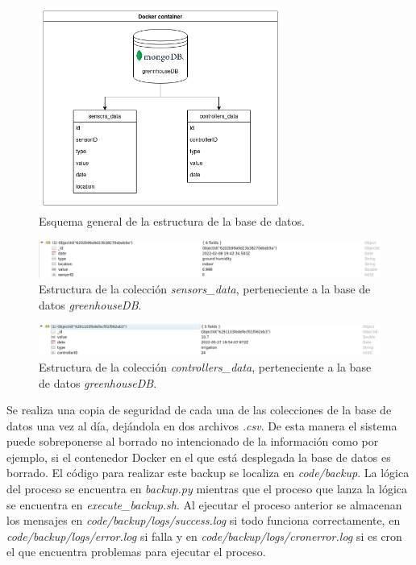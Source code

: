 \documentclass[a4paper, 12pt, oneside]{book}
\begin{document}
\begin{figure}[H]
	\centering
    \includegraphics[width=8cm, keepaspectratio]{img/estructura_db}
    \caption{Esquema general de la estructura de la base de datos.}
    \label{figura:estructura_bd}
\end{figure}
\begin{figure}[H]
	\centering
    \includegraphics[width=15cm, keepaspectratio]{img/sensors_data_collection}
    \caption{Estructura de la colección \textit{sensors\_data}, perteneciente a la base de datos \textit{greenhouseDB}.}
    \label{figura:sensors data collection}
\end{figure}
\begin{figure}[H]
	\centering
    \includegraphics[width=15cm, keepaspectratio]{img/controllers_data_collection}
    \caption{Estructura de la colección \textit{controllers\_data}, perteneciente a la base de datos \textit{greenhouseDB}.}
    \label{figura:controllers data collection}
\end{figure}


Se realiza una copia de seguridad de cada una de las colecciones de la base de datos una vez al día, dejándola en dos archivos \textit{.csv}. De esta manera el sistema puede sobreponerse al borrado no intencionado de la información como por ejemplo, si el contenedor Docker en el que está desplegada la base de datos es borrado.
El código para realizar este backup se localiza en \textit{code/backup}. La lógica del proceso se encuentra en \textit{backup.py} mientras que el proceso que lanza la lógica se encuentra en \textit{execute\_backup.sh}. 
Al ejecutar el proceso anterior se almacenan los mensajes en \textit{code/backup/logs/success.log} si todo funciona correctamente, en \textit{code/backup/logs/error.log} si falla y en \textit{code/backup/logs/cronerror.log} si es cron el que encuentra problemas para ejecutar el proceso.
\end{document}
